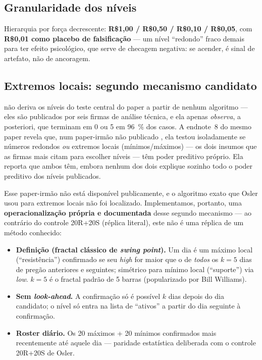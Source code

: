 \documentclass[11pt,a4paper]{article}
\begin{document}
\subsection{Granularidade dos níveis}

Hierarquia por força decrescente: \textbf{R\$1,00 / R\$0,50 / R\$0,10 / R\$0,05}, com
\textbf{R\$0,01 como placebo de falsificação} --- um nível ``redondo'' fraco demais para ter
efeito psicológico, que serve de checagem negativa: se acender, é sinal de artefato, não de
ancoragem.

\subsection{Extremos locais: segundo mecanismo candidato}
\label{sec:local}

\citet{osler2000} não deriva os níveis do teste central do paper a partir de nenhum
algoritmo --- eles são publicados por seis firmas de análise técnica, e ela apenas
\emph{observa}, a posteriori, que terminam em 0 ou 5 em \SI{96}{\percent} dos casos. A
endnote~8 do mesmo paper revela que, num paper-irmão não publicado
\citep{osler2000b}, ela testou isoladamente se números redondos \emph{ou} extremos locais
(mínimos/máximos) --- os dois insumos que as firmas mais citam para escolher níveis --- têm
poder preditivo próprio. Ela reporta que ambos têm, embora nenhum dos dois explique sozinho
todo o poder preditivo dos níveis publicados.

Esse paper-irmão não está disponível publicamente, e o algoritmo exato que Osler usou para
extremos locais não foi localizado. Implementamos, portanto, uma
\textbf{operacionalização própria e documentada} desse segundo mecanismo --- ao contrário do
controle 20R+20S (réplica literal), este não é uma réplica de um método conhecido:

\begin{itemize}
  \item \textbf{Definição (fractal clássico de \emph{swing point}).} Um dia é um máximo local
  (``resistência'') confirmado se seu \emph{high} for maior que o de \emph{todos} os $k=5$
  dias de pregão anteriores e seguintes; simétrico para mínimo local (``suporte'') via
  \emph{low}. $k=5$ é o fractal padrão de 5 barras (popularizado por Bill Williams).
  \item \textbf{Sem \emph{look-ahead}.} A confirmação só é possível $k$ dias depois do dia
  candidato; o nível só entra na lista de ``ativos'' a partir do dia seguinte à confirmação.
  \item \textbf{Roster diário.} Os 20 máximos + 20 mínimos confirmados mais recentemente até
  aquele dia --- paridade estatística deliberada com o controle 20R+20S de Osler.
\end{itemize}
\end{document}
